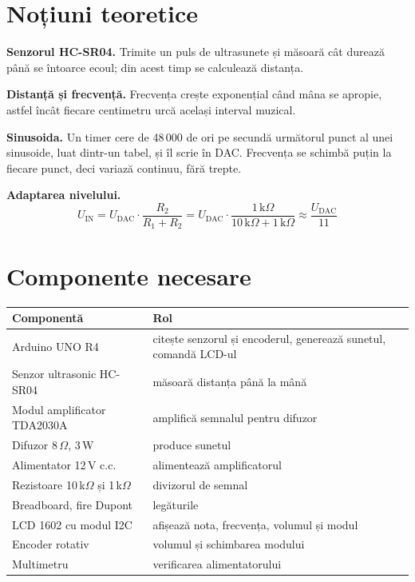\documentclass[11pt,a4paper]{article}
\begin{document}
\section{Noțiuni teoretice}

\textbf{Senzorul HC-SR04.} Trimite un puls de ultrasunete și măsoară cât durează până se întoarce ecoul; din acest timp se calculează distanța.

\textbf{Distanță și frecvență.} Frecvența crește exponențial când mâna se apropie, astfel încât fiecare centimetru urcă același interval muzical.

\textbf{Sinusoida.} Un timer cere de 48\,000 de ori pe secundă următorul punct al unei sinusoide, luat dintr-un tabel, și îl scrie în DAC. Frecvența se schimbă puțin la fiecare punct, deci variază continuu, fără trepte.

\textbf{Adaptarea nivelului.}
\[
  U_{\text{IN}} = U_{\text{DAC}} \cdot \frac{R_2}{R_1 + R_2} = U_{\text{DAC}} \cdot \frac{1\,\text{k}\Omega}{10\,\text{k}\Omega + 1\,\text{k}\Omega} \approx \frac{U_{\text{DAC}}}{11}
\]

\section{Componente necesare}
\label{sec:componente}

\begin{center}
\begin{tabularx}{\textwidth}{@{}l X@{}}
\toprule
\textbf{Componentă} & \textbf{Rol} \\
\midrule
Arduino UNO R4 & citește senzorul și encoderul, generează sunetul, comandă LCD-ul \\
Senzor ultrasonic HC-SR04 & măsoară distanța până la mână \\
Modul amplificator TDA2030A & amplifică semnalul pentru difuzor \\
Difuzor 8\,$\Omega$, 3\,W & produce sunetul \\
Alimentator 12\,V c.c. & alimentează amplificatorul \\
Rezistoare 10\,k$\Omega$ și 1\,k$\Omega$ & divizorul de semnal \\
Breadboard, fire Dupont & legăturile \\
LCD 1602 cu modul I2C & afișează nota, frecvența, volumul și modul \\
Encoder rotativ & volumul și schimbarea modului \\
Multimetru & verificarea alimentatorului \\
\bottomrule
\end{tabularx}
\end{center}
\end{document}
